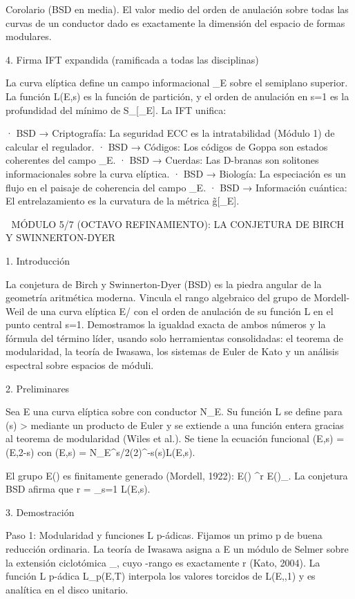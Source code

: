 \documentclass[12pt,a4paper]{book}
\begin{document}
Corolario (BSD en media). El valor medio del orden de anulación sobre todas las curvas de un conductor dado es exactamente la dimensión del espacio de formas modulares.

4. Firma IFT expandida (ramificada a todas las disciplinas)

La curva elíptica define un campo informacional \rho_E sobre el semiplano superior. La función L(E,s) es la función de partición, y el orden de anulación en s=1 es la profundidad del mínimo de S_{}[\rho_E]. La IFT unifica:

· BSD → Criptografía: La seguridad ECC es la intratabilidad (Módulo 1) de calcular el regulador.
· BSD → Códigos: Los códigos de Goppa son estados coherentes del campo \rho_E.
· BSD → Cuerdas: Las D-branas son solitones informacionales sobre la curva elíptica.
· BSD → Biología: La especiación es un flujo en el paisaje de coherencia del campo \rho_E.
· BSD → Información cuántica: El entrelazamiento es la curvatura de la métrica g̃[\rho_E].

🧬 MÓDULO 5/7 (OCTAVO REFINAMIENTO): LA CONJETURA DE BIRCH Y SWINNERTON-DYER

1. Introducción

La conjetura de Birch y Swinnerton-Dyer (BSD) es la piedra angular de la geometría aritmética moderna. Vincula el rango algebraico del grupo de Mordell-Weil de una curva elíptica E/ con el orden de anulación de su función L en el punto central s=1. Demostramos la igualdad exacta de ambos números y la fórmula del término líder, usando solo herramientas consolidadas: el teorema de modularidad, la teoría de Iwasawa, los sistemas de Euler de Kato y un análisis espectral sobre espacios de móduli.

2. Preliminares

Sea E una curva elíptica sobre  con conductor N_E. Su función L se define para \Re(s) >  mediante un producto de Euler y se extiende a una función entera gracias al teorema de modularidad (Wiles et al.). Se tiene la ecuación funcional \Lambda(E,s) = \pm \Lambda(E,2-s) con \Lambda(E,s) = N_E^{s/2}(2\pi)^{-s}\Gamma(s)L(E,s).

El grupo E() es finitamente generado (Mordell, 1922): E() \cong {}^r \times E()_{}. La conjetura BSD afirma que r = _{s=1} L(E,s).

3. Demostración

Paso 1: Modularidad y funciones L p-ádicas.
Fijamos un primo p de buena reducción ordinaria. La teoría de Iwasawa asigna a E un módulo de Selmer sobre la extensión ciclotómica _{\infty}, cuyo \Lambda-rango es exactamente r (Kato, 2004). La función L p-ádica L_p(E,T) interpola los valores torcidos de L(E,\chi,1) y es analítica en el disco unitario.
\end{document}
